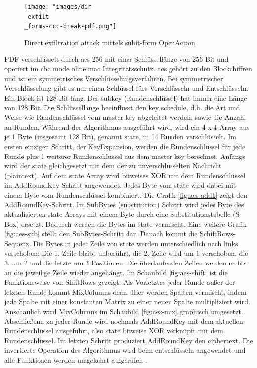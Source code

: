 \begin{figure}[!htbp]
	\centering
	\texttt{[image: "images/dir\\\_exfilt\\\_forms-ccc-break-pdf.png"]}
	\caption{Direct exfiltration attack mittels subit-form OpenAction \cite{ccc-break-pdf}}
	\label{fig:dir-exfil}
\end{figure}

PDF verschlüsselt durch \gls{aes}-256 mit einer Schlüssellänge von 256 Bit und operiert im \gls{cbc} mode ohne \gls{mac} Integritätsschutz. \gls{aes} gehört zu den Blockchiffren und ist ein symmetrisches Verschlüsselungsverfahren. Bei symmetrischer Verschlüsselung gibt es nur einen Schlüssel fürs Verschlüsseln und Entschlüsseln. Ein Block ist 128 Bit lang. Der subkey (Rundenschlüssel) hat immer eine Länge von 128 Bit. Die Schlüssellänge beeinflusst den key schedule, d.h. die Art und Weise wie Rundenschlüssel vom master key abgeleitet werden, sowie die Anzahl an Runden. Während der Algorithmus ausgeführt wird, wird ein 4 x 4 Array aus je 1 Byte (insgesamt 128 Bit), genannt state, in 14 Runden verschlüsselt. Im ersten einzigen Schritt, der KeyExpansion, werden die Rundenschlüssel für jede Runde plus 1 weiterer Rundenschlüssel aus dem master key berechnet. Anfangs wird der state gleichgesetzt mit dem der zu unverschlüsselten Nachricht (plaintext). Auf dem state Array wird bitweises XOR mit dem Rundenschlüssel im AddRoundKey-Schritt angewendet. Jedes Byte vom state wird dabei mit einem Byte vom Rundenschlüssel kombiniert. Die Grafik \ref{fig:aes-addk} zeigt den AddRoundKey-Schritt. Im SubBytes (substitution) Schritt wird jedes Byte des aktualisierten state Arrays mit einem Byte durch eine Substitutionstabelle (S-Box) ersetzt. Dadurch werden die Bytes im state vermischt. Eine weitere Grafik \ref{fig:aes-sub} stellt den SubBytes-Schritt dar. Danach kommt die SchiftRows-Sequenz. Die Bytes in jeder Zeile von state werden unterschiedlich nach links verschoben: Die 1. Zeile bleibt unberührt, die 2. Zeile wird um 1 verschoben, die 3. um 2 und die letzte um 3 Positionen. Die überlaufenden Zellen werden rechts an die jeweilige Zeile wieder angehängt. Im Schaubild \ref{fig:aes-shift} ist die Funktionsweise von ShiftRows gezeigt. Als Vorletztes jeder Runde außer der letzten Runde kommt MixColumns dran. Hier werden Spalten vermischt, indem jede Spalte mit einer konstanten Matrix zu einer neuen Spalte multipliziert wird. Anschaulich wird MixColumns im Schaubild \ref{fig:aes-mix} graphisch umgesetzt. Abschließend zu jeder Runde wird nochmals AddRoundKey mit dem aktuellen Rundenschlüssel ausgeführt, also state bitweise XOR verknüpft mit dem Rundenschlüssel. Im letzten Schritt produziert AddRoundKey den ciphertext. Die invertierte Operation des Algorithmus wird beim entschlüsseln angewendet und alle Funktionen werden umgekehrt aufgerufen \cite{intro-crypto, studyflix-aes, simply-aes}. \\

